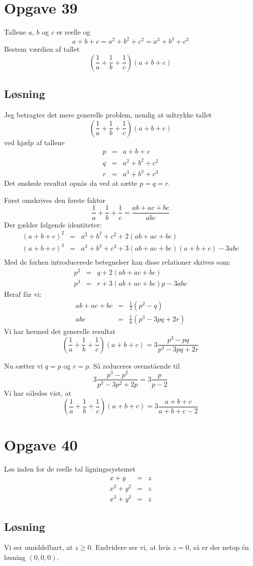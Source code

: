 \documentclass[12pt,oneside,a4paper]{article}
\newcommand{\bas}{\begin{eqnarray*}}
\newcommand{\eas}{\end{eqnarray*}}
\begin{document}
\section{Opgave 39}
Tallene $a$, $b$ og $c$ er reelle og
$$
a+b+c = a^2+b^2+c^2 = a^3+b^3+c^3
$$
Bestem værdien af tallet
$$
\left(\frac 1a + \frac 1b + \frac 1c\right) \left(a+b+c\right)
$$

\subsection{Løsning}
Jeg betragter det mere generelle problem, nemlig at udtrykke tallet
$$
\left(\frac 1a + \frac 1b + \frac 1c\right) \left(a+b+c\right)
$$
ved hjælp af tallene
\bas
p &=& a+b+c \\
q &=& a^2+b^2+c^2 \\
r &=& a^3+b^3+c^3
\eas
Det ønskede resultat opnås da ved at sætte $p=q=r$.

Først omskrives den første faktor
$$
\frac 1a + \frac 1b + \frac 1c = \frac{ab+ac+bc}{abc}
$$
Der gælder følgende identiteter:
\bas
(a+b+c)^2 &=& a^2+b^2+c^2 + 2(ab+ac+bc) \\
(a+b+c)^3 &=& a^3+b^3+c^3 + 3(ab+ac+bc)(a+b+c) - 3abc \\
\eas
Med de førhen introducerede betegnelser kan disse relationer skrives som:
\bas
p^2 &=& q + 2(ab+ac+bc) \\
p^3 &=& r + 3(ab+ac+bc)p - 3abc
\eas
Heraf får vi:
\bas
ab+ac+bc &=& \frac 12 \left(p^2-q\right) \\
abc &=& \frac 16 \left(p^3-3pq+2r\right)
\eas
Vi har hermed det generelle resultat
$$
\left(\frac 1a + \frac 1b + \frac 1c\right) \left(a+b+c\right) = 3 \frac{p^3-pq}{p^3-3pq+2r}
$$

Nu sætter vi $q=p$ og $r=p$. Så reduceres ovenstående til
$$
3 \frac{p^3-p^2}{p^3-3p^2+2p} = 3 \frac{p}{p-2}
$$
Vi har således vist, at 
$$
\left(\frac 1a + \frac 1b + \frac 1c\right) \left(a+b+c\right) = 3\frac{a+b+c}{a+b+c-2}
$$


\section{Opgave 40}
Løs inden for de reelle tal ligningssystemet
\bas
x+y &=& z \\
x^2+y^2 &=& z \\
x^3+y^3 &=& z
\eas

\subsection{Løsning}
Vi ser umiddelbart, at $z \ge 0$. Endvidere ser vi, at hvis $z=0$, så er der netop én løsning $(0, 0, 0)$.
\end{document}
